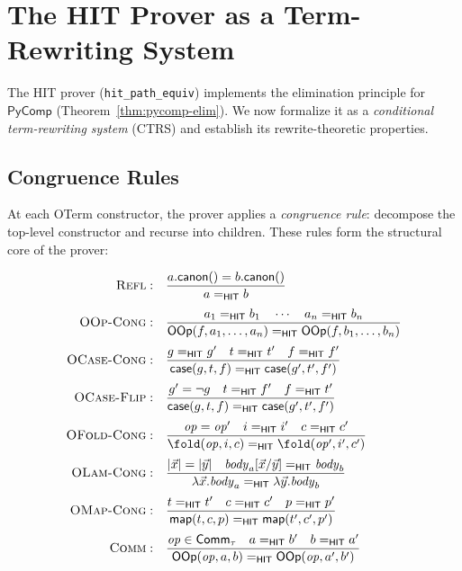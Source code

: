 \section{The HIT Prover as a Term-Rewriting System}
\label{sec:hit-rewrite-system}

The HIT prover (\texttt{hit\_path\_equiv}) implements the
elimination principle for $\mathsf{PyComp}$
(Theorem~\ref{thm:pycomp-elim}).  We now formalize it as a
\emph{conditional term-rewriting system} (CTRS) and establish its
rewrite-theoretic properties.

\subsection{Congruence Rules}

At each OTerm constructor, the prover applies a \emph{congruence rule}:
decompose the top-level constructor and recurse into children.
These rules form the structural core of the prover:

\[
\begin{array}{rl}
\textsc{Refl}: & \displaystyle
  \frac{a.\mathsf{canon}() = b.\mathsf{canon}()}
       {a =_{\mathsf{HIT}} b} \\[12pt]
\textsc{OOp-Cong}: & \displaystyle
  \frac{a_1 =_{\mathsf{HIT}} b_1 \quad \cdots \quad a_n =_{\mathsf{HIT}} b_n}
       {\mathsf{OOp}(f, a_1, \ldots, a_n) =_{\mathsf{HIT}} \mathsf{OOp}(f, b_1, \ldots, b_n)} \\[12pt]
\textsc{OCase-Cong}: & \displaystyle
  \frac{g =_{\mathsf{HIT}} g' \quad t =_{\mathsf{HIT}} t' \quad f =_{\mathsf{HIT}} f'}
       {\mathsf{case}(g, t, f) =_{\mathsf{HIT}} \mathsf{case}(g', t', f')} \\[12pt]
\textsc{OCase-Flip}: & \displaystyle
  \frac{g' = \lnot g \quad t =_{\mathsf{HIT}} f' \quad f =_{\mathsf{HIT}} t'}
       {\mathsf{case}(g, t, f) =_{\mathsf{HIT}} \mathsf{case}(g', t', f')} \\[12pt]
\textsc{OFold-Cong}: & \displaystyle
  \frac{\mathit{op} = \mathit{op}' \quad i =_{\mathsf{HIT}} i' \quad c =_{\mathsf{HIT}} c'}
       {\fold(\mathit{op}, i, c) =_{\mathsf{HIT}} \fold(\mathit{op}', i', c')} \\[12pt]
\textsc{OLam-Cong}: & \displaystyle
  \frac{|\vec{x}| = |\vec{y}| \quad \mathit{body}_a[\vec{x}/\vec{y}] =_{\mathsf{HIT}} \mathit{body}_b}
       {\lambda\vec{x}.\mathit{body}_a =_{\mathsf{HIT}} \lambda\vec{y}.\mathit{body}_b} \\[12pt]
\textsc{OMap-Cong}: & \displaystyle
  \frac{t =_{\mathsf{HIT}} t' \quad c =_{\mathsf{HIT}} c' \quad p =_{\mathsf{HIT}} p'}
       {\mathsf{map}(t, c, p) =_{\mathsf{HIT}} \mathsf{map}(t', c', p')} \\[12pt]
\textsc{Comm}: & \displaystyle
  \frac{\mathit{op} \in \mathsf{Comm}_\tau \quad a =_{\mathsf{HIT}} b' \quad b =_{\mathsf{HIT}} a'}
       {\mathsf{OOp}(\mathit{op}, a, b) =_{\mathsf{HIT}} \mathsf{OOp}(\mathit{op}, a', b')}
\end{array}
\]

